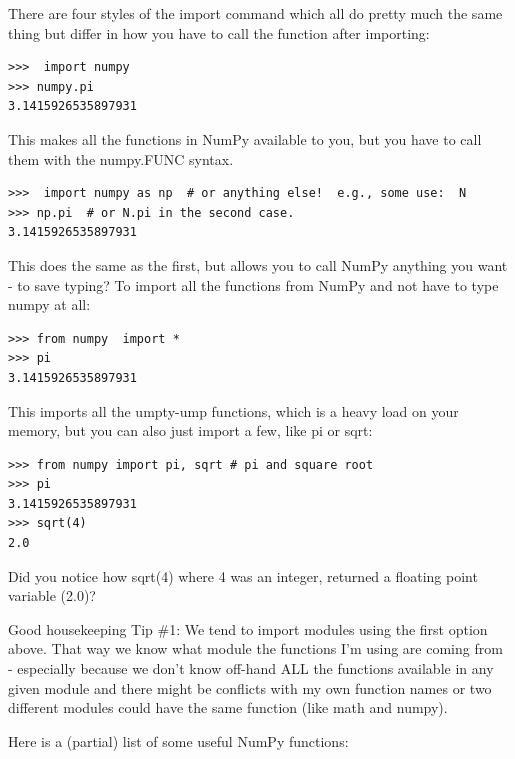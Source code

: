 \documentclass[11pt]{book}
\begin{document}
{There are four styles of the import command which all do pretty much the same thing but differ in how you have to call the function after importing:

{ \color{blue} \begin{verbatim}
>>>  import numpy
>>> numpy.pi
3.1415926535897931
\end{verbatim}}
\noindent
This makes all the functions in NumPy available to you, but you have to call them with the {\color{blue}numpy.FUNC} syntax.

{ \color{blue} \begin{verbatim}
>>>  import numpy as np  # or anything else!  e.g., some use:  N
>>> np.pi  # or N.pi in the second case.
3.1415926535897931
\end{verbatim}}
\noindent
This does the same as the first, but allows you to call NumPy anything you want - to save typing?
\noindent
To import all the functions from NumPy and not have to type numpy at all:
{ \color{blue} \begin{verbatim}
>>> from numpy  import *
>>> pi
3.1415926535897931
\end{verbatim}}
\noindent
This imports all the umpty-ump functions, which is a heavy load on your memory,  but you can also just import a few, like {\color{blue}pi} or {\color{blue}sqrt}:
{ \color{blue} \begin{verbatim}
>>> from numpy import pi, sqrt # pi and square root
>>> pi
3.1415926535897931
>>> sqrt(4)
2.0
\end{verbatim}
}
\noindent
Did you notice how {\color{blue}sqrt(4)} where 4 was an integer, returned a floating point variable (2.0)?

{\color{magenta}Good housekeeping Tip \#1: We tend to import modules using the first option above.  That way we know what module the functions I'm using are coming from - especially because we don't know off-hand ALL the functions available in any given module and there might be conflicts with my own function names or two different modules could have the same function (like} {\color{blue}math} {\color{magenta}and }{\color{blue}numpy}).


Here is a (partial) list of some useful {\color{blue}NumPy} functions:


}
\end{document}
